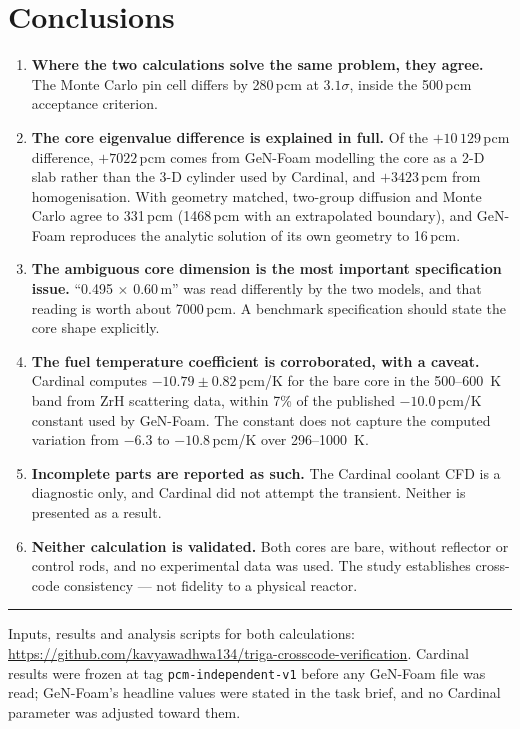 \documentclass[11pt,a4paper]{article}
\newcommand{\pcm}{\,pcm}
\begin{document}
\section{Conclusions}
\begin{enumerate}\itemsep4pt
\item \textbf{Where the two calculations solve the same problem, they agree.} The Monte Carlo
pin cell differs by 280\pcm{} at $3.1\sigma$, inside the 500\pcm{} acceptance criterion.

\item \textbf{The core eigenvalue difference is explained in full.} Of the $+10\,129$\pcm{}
difference, $+7022$\pcm{} comes from GeN-Foam modelling the core as a 2-D slab rather than the
3-D cylinder used by Cardinal, and $+3423$\pcm{} from homogenisation. With geometry matched,
two-group diffusion and Monte Carlo agree to 331\pcm{} (1468\pcm{} with an extrapolated
boundary), and GeN-Foam reproduces the analytic solution of its own geometry to 16\pcm{}.

\item \textbf{The ambiguous core dimension is the most important specification issue.}
``0.495 $\times$ 0.60\,m'' was read differently by the two models, and that reading is worth
about 7000\pcm{}. A benchmark specification should state the core shape explicitly.

\item \textbf{The fuel temperature coefficient is corroborated, with a caveat.} Cardinal
computes $-10.79\pm0.82$\,pcm/K for the bare core in the 500--\SI{600}{\kelvin} band from ZrH
scattering data, within 7\% of the published $-10.0$\,pcm/K constant used by GeN-Foam. The constant does not
capture the computed variation from $-6.3$ to $-10.8$\,pcm/K over 296--\SI{1000}{\kelvin}.

\item \textbf{Incomplete parts are reported as such.} The Cardinal coolant CFD is a diagnostic
only, and Cardinal did not attempt the transient. Neither is presented as a result.

\item \textbf{Neither calculation is validated.} Both cores are bare, without reflector or
control rods, and no experimental data was used. The study establishes cross-code
consistency --- not fidelity to a physical reactor.
\end{enumerate}

\vspace{5mm}\hrule\vspace{2mm}
\footnotesize\color{ink2}
Inputs, results and analysis scripts for both calculations:\\
\url{https://github.com/kavyawadhwa134/triga-crosscode-verification}.
Cardinal results were frozen at tag \texttt{pcm-independent-v1} before any GeN-Foam file was read; GeN-Foam's headline values were stated in the task brief, and no Cardinal parameter was adjusted toward them.
\end{document}
